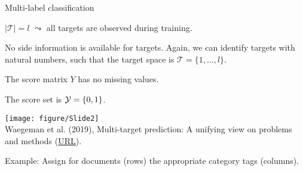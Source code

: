\documentclass[11pt,compress,t,notes=noshow, xcolor=table]{beamer}
\newcommand{\Tspace}{\mathcal{T}}
\begin{document}
\begin{frame}{Multi-label classification}
	\small
	\begin{itemize}
		\small 

        \begin{minipage}{0.45\textwidth}  
            \item $|\Tspace|=l$ $\leadsto$ all targets are observed during training.
            \vspace{10pt}
            
            \item No side information is available for targets. Again, we can identify targets with natural numbers, such that the target space is $\Tspace = \{1,...,l\}$. 
            \vspace{10pt}
            
			\item The score matrix $Y$ has no missing values. 	
            \vspace{10pt}
			\item The score set is $\mathcal{Y} = \{0,1\}$.	
		\end{minipage}
        \hfill
		\begin{minipage}{0.45\textwidth}    
		\begin{center}
			\texttt{[image: figure/Slide2]} \tiny
			\\ Waegeman et al. (2019), Multi-target prediction:
			A unifying view on problems and methods (\href{https://arxiv.org/pdf/1809.02352.pdf}{\underline{URL}}).
		\end{center}
		\end{minipage}
	\end{itemize}	

    \vspace{10pt}
	Example: Assign for documents (rows) the appropriate category tags (columns).

\end{frame}
\end{document}
